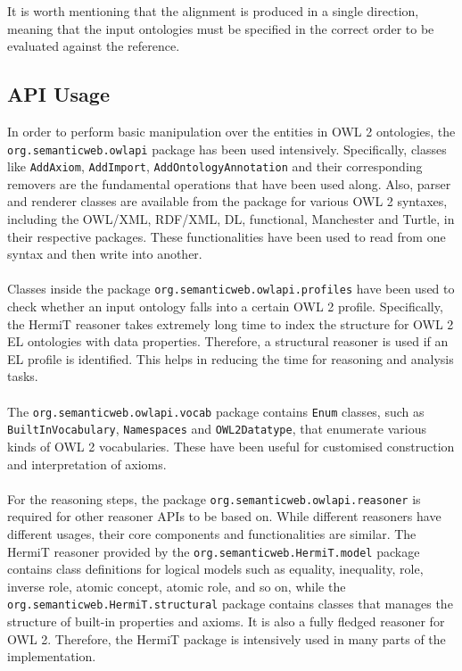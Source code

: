 It is worth mentioning that the alignment is produced in a single direction, meaning that the input ontologies must be specified in the correct order to be evaluated against the reference.

\subsection{API Usage}

In order to perform basic manipulation over the entities in OWL 2 ontologies, the \\
\texttt{org.semanticweb.owlapi} package has been used intensively. Specifically, classes like \texttt{AddAxiom}, \texttt{AddImport}, \texttt{AddOntologyAnnotation} and their corresponding removers are the fundamental operations that have been used along. Also, parser and renderer classes are available from the package for various OWL 2 syntaxes, including the OWL/XML, RDF/XML, DL, functional, Manchester and Turtle, in their respective packages. These functionalities have been used to read from one syntax and then write into another.
\\\\
Classes inside the package \texttt{org.semanticweb.owlapi.profiles} have been used to check whether an input ontology falls into a certain OWL 2 profile. Specifically, the HermiT reasoner takes extremely long time to index the structure for OWL 2 EL ontologies with data properties. Therefore, a structural reasoner is used if an EL profile is identified. This helps in reducing the time for reasoning and analysis tasks.
\\\\
The \texttt{org.semanticweb.owlapi.vocab} package contains \texttt{Enum} classes, such as \\
\texttt{BuiltInVocabulary}, \texttt{Namespaces} and \texttt{OWL2Datatype}, that enumerate various kinds of OWL 2 vocabularies. These have been useful for customised construction and interpretation of axioms.
\\\\
For the reasoning steps, the package \texttt{org.semanticweb.owlapi.reasoner} is required for other reasoner APIs to be based on. While different reasoners have different usages, their core components and functionalities are similar. The HermiT reasoner provided by the \texttt{org.semanticweb.HermiT.model} package contains class definitions for logical models such as equality, inequality, role, inverse role, atomic concept, atomic role, and so on, while the \texttt{org.semanticweb.HermiT.structural} package contains classes that manages the structure of built-in properties and axioms. It is also a fully fledged reasoner for OWL 2. Therefore, the HermiT package is intensively used in many parts of the implementation.
